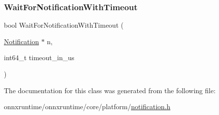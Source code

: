 \subsubsection{\texorpdfstring{Wait\+For\+Notification\+With\+Timeout}{WaitForNotificationWithTimeout}}
{\footnotesize\ttfamily bool Wait\+For\+Notification\+With\+Timeout (\begin{DoxyParamCaption}\item[{\mbox{\hyperlink{classonnxruntime_1_1Notification}{Notification}} $\ast$}]{n,  }\item[{int64\+\_\+t}]{timeout\+\_\+in\+\_\+us }\end{DoxyParamCaption})\hspace{0.3cm}{\ttfamily [friend]}}



The documentation for this class was generated from the following file\+:\begin{DoxyCompactItemize}
\item 
onnxruntime/onnxruntime/core/platform/\mbox{\hyperlink{notification_8h}{notification.\+h}}\end{DoxyCompactItemize}
